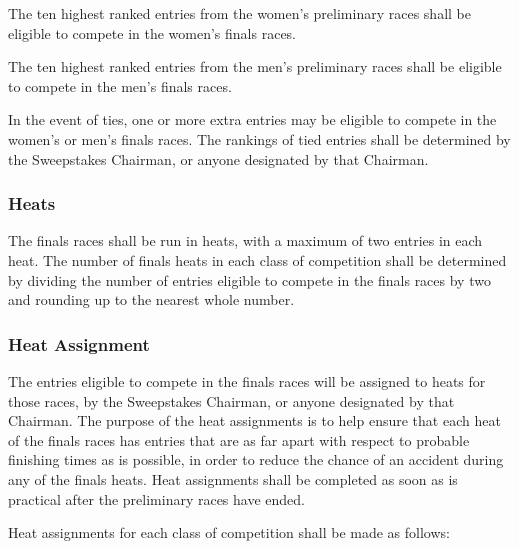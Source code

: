 	The ten highest ranked entries from the women's preliminary races shall be eligible to compete in the women's finals races.

	The ten highest ranked entries from the men's preliminary races shall be eligible to compete in the men's finals races.

	In the event of ties, one or more extra entries may be eligible to compete in the women's or men's finals races. The rankings of tied entries shall be determined by the Sweepstakes Chairman, or anyone designated by that Chairman.

\subsubsection{Heats}

	The finals races shall be run in heats, with a maximum of two entries in each heat. The number of finals heats in each class of competition shall be determined by dividing the number of entries eligible to compete in the finals races by two and rounding up to the nearest whole number.

\subsubsection{Heat Assignment}

	The entries eligible to compete in the finals races will be assigned to heats for those races, by the Sweepstakes Chairman, or anyone designated by that Chairman. The purpose of the heat assignments is to help ensure that each heat of the finals races has entries that are as far apart with respect to probable finishing times as is possible, in order to reduce the chance of an accident during any of the finals heats. Heat assignments shall be completed as soon as is practical after the preliminary races have ended.
	\newline

	\noindent Heat assignments for each class of competition shall be made as follows:

